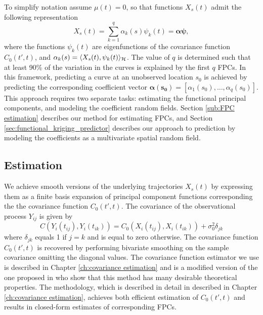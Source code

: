 To simplify notation assume $\mu(t)=0$, so that functions $X_s(t)$ admit the following representation 
\begin{equation}
	X_{s}(t) = \sum_{k=1}^{q} \alpha_k(s)\psi_k(t) = \boldsymbol{\alpha}\boldsymbol{\psi}, \label{kriging: fpc expansion}
\end{equation}
where the functions $\psi_k(t)$ are eigenfunctions of the covariance function $C_0(t',t)$, and $\alpha_k(s) = \langle X_s(t),  \psi_k(t) \rangle_{\mathcal{H}}$. The value of $q$ is determined such that at least 90\% of the variation in the curves is explained by the first $q$ FPCs. In this framework, predicting a curve at an unobserved location $s_0$ is achieved by predicting the corresponding coefficient vector $\boldsymbol{\alpha(s_0)}=[\alpha_1(s_0), \dots, \alpha_q(s_0)]$. This approach requires two separate tasks: estimating the functional principal components, and modeling the coefficient random fields. Section \ref{sub:FPC estimation} describes our method for estimating FPCs, and Section \ref{sec:functional_kriging_predictor} describes our approach to prediction by modeling the coefficients as a multivariate spatial random field.
\subsection{Estimation} %
\label{sub:estimation}

We achieve smooth versions of the underlying trajectories $X_s(t)$ by expressing them as a finite basis expansion of principal component functions corresponding the the covariance function $C_0(t',t)$. The covariance of the observational process $Y_{ij}$ is given by
\begin{equation}
	C(Y_i(t_{ij}), Y_i(t_{ik})) = C_0(X_i(t_{ij}), X_i(t_{ik})) + \sigma^2_0 \delta_{jk}
\end{equation}
where $\delta_{jk}$ equals 1 if $j=k$ and is equal to zero otherwise. The covariance function $C_0(t',t)$ is recovered by performing bivariate smoothing on the sample covariance omitting the diagonal values.  The covariance function estimator we use is described in Chapter \ref{ch:covariance estimation} and is a modified version of the one proposed in \cite{Cai:2010vr} who show that this method has many desirable theoretical properties. The methodology, which is described in detail in described in Chapter \ref{ch:covariance estimation}, achieves both efficient estimation of $C_0(t',t)$ and results in closed-form estimates of corresponding FPCs.

